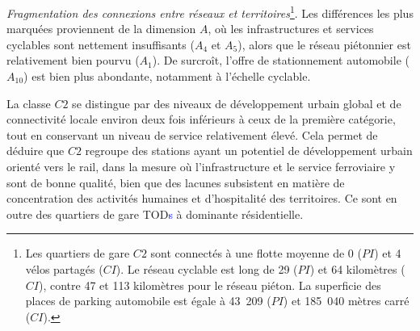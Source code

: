 \begin{refsegment}
\begin{customitemize}
    \item \textsl{Fragmentation des connexions entre réseaux et territoires}\footnote{
        Les quartiers de gare \(C2\) sont connectés à une flotte moyenne de 0 (\(PI\)) et 4 vélos partagés (\(CI\)). Le réseau cyclable est long de 29 (\(PI\)) et 64 kilomètres (\(CI\)), contre 47 et 113 kilomètres pour le réseau piéton. La superficie des places de parking automobile est égale à 43~209 (\(PI\)) et 185~040 mètres carré (\(CI\)).
    }. Les différences les plus marquées proviennent de la dimension \(A\), où les infrastructures et services cyclables sont nettement insuffisants (\(A_{4}\) et \(A_{5}\)), alors que le réseau piétonnier est relativement bien pourvu (\(A_{1}\)). De surcroît, l’offre de stationnement automobile (\(A_{10}\)) est bien plus abondante, notamment à l’échelle cyclable.
\end{customitemize}%

La classe \(C2\) se distingue par des niveaux de développement urbain global et de connectivité locale environ deux fois inférieurs à ceux de la première catégorie, tout en conservant un niveau de service relativement élevé. Cela permet de déduire que \(C2\) regroupe des stations ayant un potentiel de développement urbain orienté vers le rail, dans la mesure où l’infrastructure et le service ferroviaire y sont de bonne qualité, bien que des lacunes subsistent en matière de concentration des activités humaines et d’hospitalité des territoires. Ce sont en outre des quartiers de gare \acrshort{TOD}\textcolor{blue}{s} à dominante résidentielle.%




\end{refsegment}
